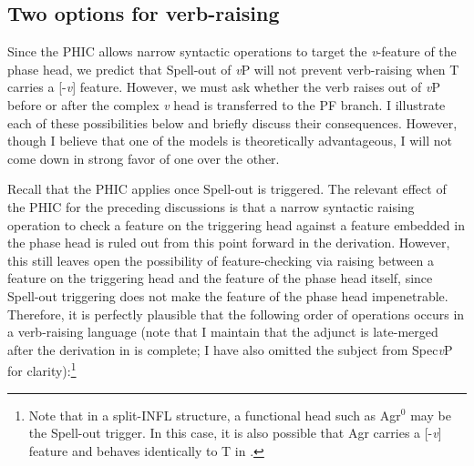 \subsection{Two options for verb-raising}
Since the PHIC allows narrow syntactic operations to target the {\it v}-feature of the phase head, we predict that Spell-out of {\it v}P will not prevent verb-raising when T carries a [-{\it v}] feature. However, we must ask whether the verb raises out of {\it v}P before or after the complex {\it v} head is transferred to the PF branch. I illustrate each of these possibilities below and briefly discuss their consequences. However, though I believe that one of the models is theoretically advantageous, I will not come down in strong favor of one over the other.

Recall that the PHIC applies once Spell-out is triggered. The relevant effect of the PHIC for the preceding discussions is that a narrow syntactic raising operation to check a feature on the triggering head against a feature embedded in the phase head is ruled out from this point forward in the derivation. However, this still leaves open the possibility of feature-checking via raising between a feature on the triggering head and the feature of the phase head itself, since Spell-out triggering does not make the feature of the phase head impenetrable. Therefore, it is perfectly plausible that the following order of operations occurs in a verb-raising language (note that I maintain that the adjunct is late-merged after the derivation in \Next is complete; I have also omitted the subject from Spec{\it v}P for clarity):\footnote{Note that in a split-INFL structure, a functional head such as Agr$^{0}$ may be the Spell-out trigger. In this case, it is also possible that Agr carries a [-{\it v}] feature and behaves identically to T in \Next.}

